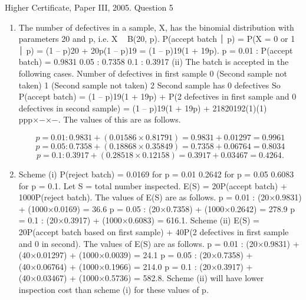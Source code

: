 \documentclass[a4paper,12pt]{article}
\begin{document}
Higher Certificate, Paper III, 2005. Question 5
\begin{enumerate}
\item The number of defectives in a sample, X, has the binomial distribution with parameters 20 and p, i.e. X ~ B(20, p).
P(accept batch ⏐ p) = P(X = 0 or 1 ⏐ p) = (1 – p)20 + 20p(1 – p)19
= (1 – p)19(1 + 19p).
p = 0.01 : P(accept batch) = 0.9831
0.05 : 0.7358
0.1 : 0.3917
(ii) The batch is accepted in the following cases.
Number of defectives in first sample
0
(Second sample not taken)
1
(Second sample not taken)
2
Second sample has 0 defectives
So P(accept batch)
= (1 – p)19(1 + 19p)
+ P(2 defectives in first sample and 0 defectives in second sample)
= (1 – p)19(1 + 19p) + 21820192(1)(1) ppp×−×−.
The values of this are as follows.

\[p = 0.01 : 0.9831 + (0.01586×0.81791) = 0.9831 + 0.01297 = 0.9961\]
\[p = 0.05 : 0.7358 + (0.18868×0.35849) = 0.7358 + 0.06764 = 0.8034\]
\[p = 0.1 : 0.3917 + (0.28518×0.12158) = 0.3917 + 0.03467 = 0.4264.\]
\item 
Scheme (i) P(reject batch) = 0.0169 for p = 0.01
0.2642 for p = 0.05
0.6083 for p = 0.1.
Let S = total number inspected. E(S) = 20P(accept batch) + 1000P(reject batch).
The values of E(S) are as follows.
p = 0.01 : (20×0.9831) + (1000×0.0169) = 36.6
p = 0.05 : (20×0.7358) + (1000×0.2642) = 278.9
p = 0.1 : (20×0.3917) + (1000×0.6083) = 616.1.
Scheme (ii)
E(S) = 20P(accept batch based on first sample)
+ 40P(2 defectives in first sample and 0 in second).
The values of E(S) are as follows.
p = 0.01 : (20×0.9831) + (40×0.01297) + (1000×0.0039) = 24.1
p = 0.05 : (20×0.7358) + (40×0.06764) + (1000×0.1966) = 214.0
p = 0.1 : (20×0.3917) + (40×0.03467) + (1000×0.5736) = 582.8.
Scheme (ii) will have lower inspection cost than scheme (i) for these values of p.
\end{enumerate}
\end{document}
